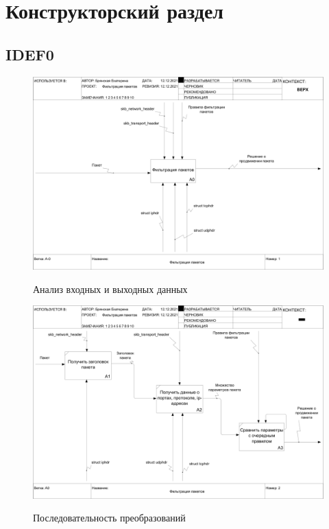 \section{Конструкторский раздел}

\subsection{IDEF0}
\begin{figure}[h]
	\begin{center}
		{\includegraphics[scale = 0.3]{img/idef0/main.png}}
		\caption{Анализ входных и выходных данных}
		\label{fig29:image}
	\end{center}
\end{figure}


\begin{figure}[h!]
	\begin{center}
		{\includegraphics[scale = 0.3]{img/idef0/down.png}}
		\caption{Последовательность преобразований}
		\label{fig200:image}
	\end{center}
\end{figure}

